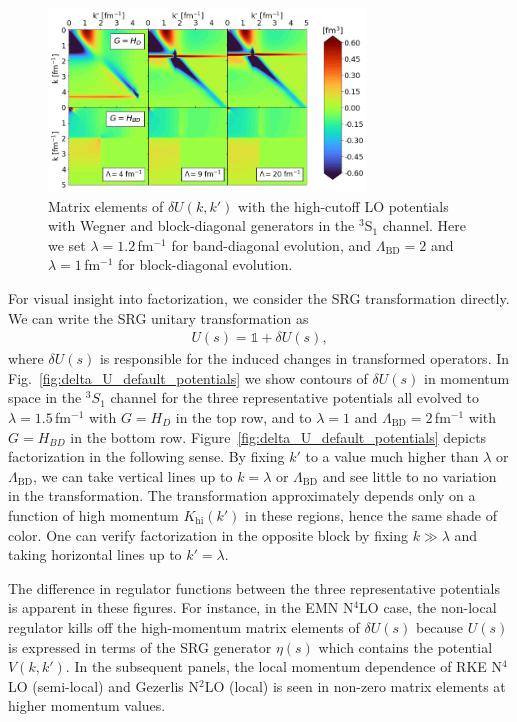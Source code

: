 \documentclass[10pt,aps,prc,floatfix,twocolumn,nofootinbib]{revtex4-1}
\newcommand{\LambdaBD}{{\Lambda_{\text{BD}}}}
\newcommand{\Khi}{K_{\text{hi}}}
\begin{document}
\begin{figure}[tbh]
	\includegraphics[clip,width=0.75\textwidth]{unitary_transformation_contours_kvnns_900_901_902_lamb1,2_Lamb2,0.png}%
    \caption{Matrix elements of $\delta U(k,k')$ with the high-cutoff LO potentials with Wegner and block-diagonal generators in the $^3$S$_1$ channel. Here we set $\lambda=1.2$\,fm$^{-1}$ for band-diagonal evolution, and $\LambdaBD=2$ and $\lambda=1$\,fm$^{-1}$ for block-diagonal evolution.}
	\label{fig:delta_U_high_cutoffs}
\end{figure}
%

For visual insight into factorization, we consider the SRG transformation directly.
We can write the SRG unitary transformation as
%
\begin{eqnarray}
    \label{eq:delta_U}
    U(s) = \mathbb{1} + \delta U(s),
\end{eqnarray}
%
where $\delta U(s)$ is responsible for the induced changes in transformed operators.
In Fig.~\ref{fig:delta_U_default_potentials} we show contours of $\delta U(s)$ in momentum space in the $^{3}S_1$ channel for the three representative potentials all evolved to $\lambda=1.5$\,fm$^{-1}$ with $G=H_D$ in the top row, and to $\lambda=1$ and $\LambdaBD=2$\,fm$^{-1}$ with $G=H_{BD}$ in the bottom row.
Figure~\ref{fig:delta_U_default_potentials} depicts factorization in the following sense.
By fixing $k'$ to a value much higher than $\lambda$ or $\LambdaBD$, we can take vertical lines up to $k=\lambda$ or $\LambdaBD$ and see little to no variation in the transformation.
The transformation approximately depends only on a function of high momentum $\Khi(k')$ in these regions, hence the same shade of color.
One can verify factorization in the opposite block by fixing $k \gg \lambda$ and taking horizontal lines up to $k'=\lambda$.


The difference in regulator functions between the three representative potentials is apparent in these figures.
For instance, in the EMN N$^4$LO case, the non-local regulator kills off the high-momentum matrix elements of $\delta U(s)$ because $U(s)$ is expressed in terms of the SRG generator $\eta(s)$ which contains the potential $V(k,k')$.
In the subsequent panels, the local momentum dependence of RKE N$^4$LO (semi-local) and Gezerlis N$^2$LO (local) is seen in non-zero matrix elements at higher momentum values.
\end{document}
